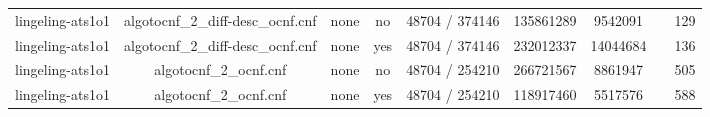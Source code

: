 \begin{appendices}
\begin{table}[p]
\begin{center}
\begin{tabular}{l|cccccccc}
  lingeling-ats1o1               & algotocnf\_2\_diff-desc\_ocnf.cnf & none       & no    & 48704 / 374146 & 135861289 & 9542091   &            & 129 \\ %
  lingeling-ats1o1               & algotocnf\_2\_diff-desc\_ocnf.cnf & none       & yes   & 48704 / 374146 & 232012337 & 14044684  &            & 136 \\ %
  lingeling-ats1o1               & algotocnf\_2\_ocnf.cnf         & none       & no    & 48704 / 254210 & 266721567 & 8861947   &            & 505 \\ %
  lingeling-ats1o1               & algotocnf\_2\_ocnf.cnf         & none       & yes   & 48704 / 254210 & 118917460 & 5517576   &            & 588 \\ %
    \end{tabular}
  \end{center}
\end{table}

\newpage


\end{appendices}
